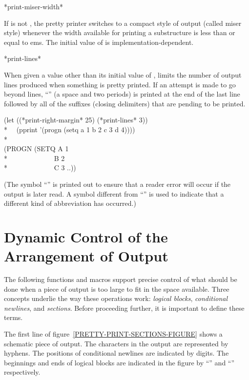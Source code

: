 \begin{defun}[Variable]
*print-miser-width*

If  is not , the pretty printer switches to a compact
style of output (called miser style) whenever the width available for
printing a substructure is less than or equal to  ems.
The initial value of  is implementation-dependent.
\end{defun}

\begin{defun}[Variable]
*print-lines*

When given a value other than its initial value of ,
 limits the number of output lines produced when
something is pretty printed.  If an attempt is made to go beyond
 lines, ``'' (a space and two periods)
is printed at the end of the last
line followed by all of the suffixes (closing delimiters) that are pending
to be printed.
\begin{lisp}
(let ((*print-right-margin* 25) (*print-lines* 3)) \\*
~~(pprint '(progn (setq a 1 b 2 c 3 d 4)))) \\*
\\
(PROGN (SETQ A 1 \\*
~~~~~~~~~~~~~B 2 \\*
~~~~~~~~~~~~~C 3 ..))
\end{lisp}

(The symbol ``'' is printed out to ensure that a reader error will
occur if the output is later read.  A symbol different from ``'' is
used to indicate that a different kind of abbreviation has occurred.)
\end{defun}



\section{Dynamic Control of the Arrangement of Output}

The following functions and macros support precise control of what should
be done when a piece of output is too large to fit in the space available.
Three concepts underlie the way these operations work: {\it logical blocks},
{\it conditional newlines}, and {\it sections}.  Before proceeding further, it is
important to define these terms.

The first line of figure~\ref{PRETTY-PRINT-SECTIONS-FIGURE} shows a
schematic piece of output.  The characters in the output are represented by
hyphens.  The positions of conditional newlines are indicated by
digits.  The beginnings and ends of logical blocks are indicated in the
figure by ``\cdf{<}'' and ``\cdf{>}'' respectively.

